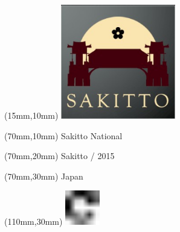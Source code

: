 \null\newpage
\begin{textblock*}{50mm}(15mm,10mm)%
\includegraphics[width=50mm]{LG/2015-05-20_00093.png}
\end{textblock*}
\begin{textblock*}{130mm}(70mm,10mm)%
{\fontsize{20}{20}\selectfont Sakitto National}\\
\end{textblock*}
\begin{textblock*}{120mm}(70mm,20mm)%
{\fontsize{16}{16}\selectfont Sakitto / 2015}\\
\end{textblock*}
\begin{textblock*}{120mm}(70mm,30mm)%
{\fontsize{12}{12}\selectfont Japan}
\end{textblock*}
\begin{textblock*}{30mm}(110mm,30mm)%
\centering
\includegraphics[height=15mm]{icons/fa-rotate-right.pdf}
\end{textblock*}
